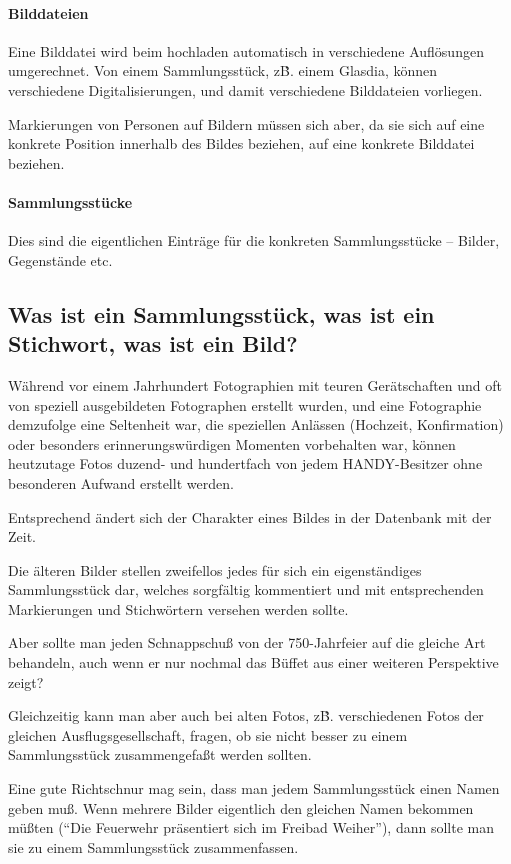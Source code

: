 \documentclass{scrartcl}
\begin{document}
\paragraph{Bilddateien} Eine Bilddatei wird beim hochladen automatisch in verschiedene
Auflösungen umgerechnet. Von einem Sammlungsstück, z\.B. einem Glasdia, können verschiedene
Digitalisierungen, und damit verschiedene Bilddateien vorliegen.

Markierungen von Personen auf Bildern müssen sich aber, da sie sich
auf eine konkrete Position innerhalb des Bildes beziehen, auf eine konkrete Bilddatei beziehen.

\paragraph{Sammlungsstücke} Dies sind die eigentlichen Einträge für die konkreten Sammlungsstücke --
Bilder, Gegenstände etc.

\subsection{Was ist ein Sammlungsstück, was ist ein Stichwort, was ist ein Bild?}

Während vor einem Jahrhundert Fotographien mit teuren Gerätschaften
und oft von speziell ausgebildeten Fotographen erstellt wurden, und
eine Fotographie demzufolge eine Seltenheit war, die speziellen
Anlässen (Hochzeit, Konfirmation) oder besonders erinnerungswürdigen
Momenten vorbehalten war, können heutzutage Fotos duzend- und
hundertfach von jedem HANDY-Besitzer ohne besonderen Aufwand erstellt
werden.

Entsprechend ändert sich der Charakter eines Bildes in der Datenbank
mit der Zeit.

Die älteren Bilder stellen zweifellos jedes für sich ein
eigenständiges Sammlungsstück dar, welches sorgfältig kommentiert und
mit entsprechenden Markierungen und Stichwörtern versehen werden
sollte.

Aber sollte man jeden Schnappschuß von der 750-Jahrfeier auf die
gleiche Art behandeln, auch wenn er nur nochmal das Büffet aus einer
weiteren Perspektive zeigt?

Gleichzeitig kann man aber auch bei alten Fotos, z\.B. verschiedenen
Fotos der gleichen Ausflugsgesellschaft, fragen, ob sie nicht besser
zu einem Sammlungsstück zusammengefaßt werden sollten.

Eine gute Richtschnur mag sein, dass man jedem Sammlungsstück einen
Namen geben muß. Wenn mehrere Bilder eigentlich den gleichen Namen
bekommen müßten (``Die Feuerwehr präsentiert sich im Freibad Weiher''),
dann sollte man sie zu einem Sammlungsstück zusammenfassen.
\end{document}

